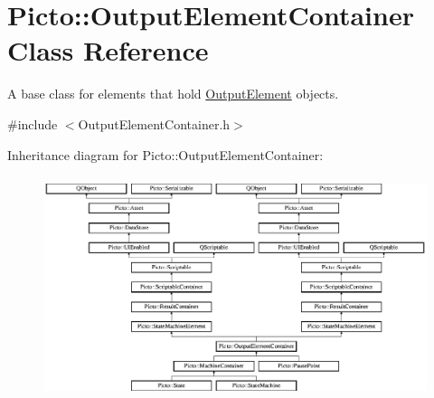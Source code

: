 \hypertarget{class_picto_1_1_output_element_container}{\section{Picto\-:\-:Output\-Element\-Container Class Reference}
\label{class_picto_1_1_output_element_container}
}


A base class for elements that hold \hyperlink{class_picto_1_1_output_element}{Output\-Element} objects.  




{\ttfamily \#include $<$Output\-Element\-Container.\-h$>$}

Inheritance diagram for Picto\-:\-:Output\-Element\-Container\-:\begin{figure}[H]
\begin{center}
\leavevmode
\includegraphics[height=6.484210cm]{class_picto_1_1_output_element_container}
\end{center}
\end{figure}

